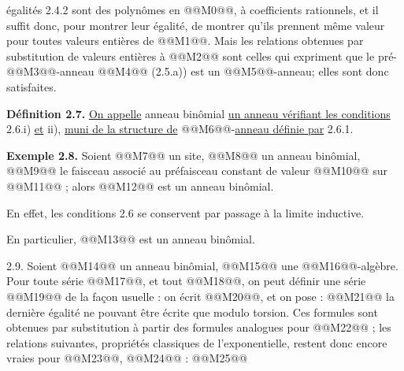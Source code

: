 
égalités 2.4.2 sont des polynômes en @@M0@@, à coefficients rationnels, et il suffit donc, pour montrer leur égalité, de montrer qu'ils prennent même valeur pour toutes valeurs entières de @@M1@@. Mais les relations obtenues par substitution de valeurs entières à @@M2@@ sont celles qui expriment que le pré-@@M3@@-anneau @@M4@@ (2.5.a)) est un @@M5@@-anneau; elles sont donc satisfaites.

\textbf{Définition 2.7.} \uline{On appelle} anneau binômial \uline{un anneau vérifiant les conditions} 2.6.i) \uline{et} ii), \uline{muni de la structure de} @@M6@@-\uline{anneau définie par} 2.6.1.

\textbf{Exemple 2.8.} Soient @@M7@@ un site, @@M8@@ un anneau binômial, @@M9@@ le faisceau associé au préfaisceau constant de valeur @@M10@@ sur @@M11@@ ; alors @@M12@@ est un anneau binômial.

En effet, les conditions 2.6 se conservent par passage à la limite inductive.

En particulier, @@M13@@ est un anneau binômial.

2.9. Soient @@M14@@ un anneau binômial, @@M15@@ une @@M16@@-algèbre. Pour toute série @@M17@@, et tout @@M18@@, on peut définir une série @@M19@@ de la façon usuelle : on écrit @@M20@@, et on pose :
@@M21@@
la dernière égalité ne pouvant être écrite que modulo torsion. Ces formules sont obtenues par substitution à partir des formules analogues pour @@M22@@ ; les relations suivantes, propriétés classiques de l'exponentielle, restent donc encore vraies pour @@M23@@, @@M24@@ :
@@M25@@



\providecommand{\Ghat}{\widehat G}
\providecommand{\Gg}{\widehat G_g}
\providecommand{\Gcirc}{\widehat G_{\circ}}
\providecommand{\Gnabla}{\widehat G_{\nabla}}
\providecommand{\Grhat}{\widehat{\operatorname{Gr}}}
\providecommand{\Log}{\operatorname{Log}}
\providecommand{\Fil}{\operatorname{Fil}}
\providecommand{\eps}{\varepsilon}
\renewcommand{\id}{\operatorname{id}}
\providecommand{\Sym}{\operatorname{Sym}}
\providecommand{\Mon}{\operatorname{Mon}}


